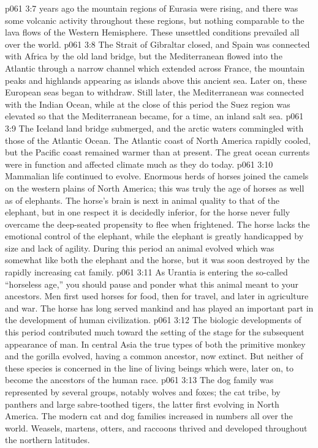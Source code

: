 \vs p061 3:7 \pc {} years ago the mountain regions of Eurasia were rising, and there was some volcanic activity throughout these regions, but nothing comparable to the lava flows of the Western Hemisphere. These unsettled conditions prevailed all over the world.
\vs p061 3:8 The Strait of Gibraltar closed, and Spain was connected with Africa by the old land bridge, but the Mediterranean flowed into the Atlantic through a narrow channel which extended across France, the mountain peaks and highlands appearing as islands above this ancient sea. Later on, these European seas began to withdraw. Still later, the Mediterranean was connected with the Indian Ocean, while at the close of this period the Suez region was elevated so that the Mediterranean became, for a time, an inland salt sea.
\vs p061 3:9 The Iceland land bridge submerged, and the arctic waters commingled with those of the Atlantic Ocean. The Atlantic coast of North America rapidly cooled, but the Pacific coast remained warmer than at present. The great ocean currents were in function and affected climate much as they do today.
\vs p061 3:10 Mammalian life continued to evolve. Enormous herds of horses joined the camels on the western plains of North America; this was truly the age of horses as well as of elephants. The horse’s brain is next in animal quality to that of the elephant, but in one respect it is decidedly inferior, for the horse never fully overcame the deep\hyp{}seated propensity to flee when frightened. The horse lacks the emotional control of the elephant, while the elephant is greatly handicapped by size and lack of agility. During this period an animal evolved which was somewhat like both the elephant and the horse, but it was soon destroyed by the rapidly increasing cat family.
\vs p061 3:11 \pc As Urantia is entering the so\hyp{}called “horseless age,” you should pause and ponder what this animal meant to your ancestors. Men first used horses for food, then for travel, and later in agriculture and war. The horse has long served mankind and has played an important part in the development of human civilization.
\vs p061 3:12 \pc The biologic developments of this period contributed much toward the setting of the stage for the subsequent appearance of man. In central Asia the true types of both the primitive monkey and the gorilla evolved, having a common ancestor, now extinct. But neither of these species is concerned in the line of living beings which were, later on, to become the ancestors of the human race.
\vs p061 3:13 The dog family was represented by several groups, notably wolves and foxes; the cat tribe, by panthers and large sabre\hyp{}toothed tigers, the latter first evolving in North America. The modern cat and dog families increased in numbers all over the world. Weasels, martens, otters, and raccoons thrived and developed throughout the northern latitudes.
